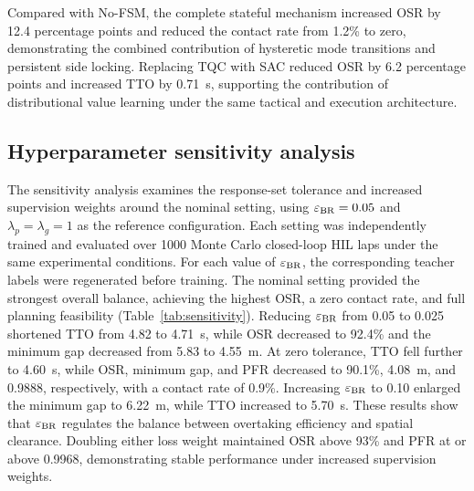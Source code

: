 \documentclass[journal,twoside,web]{ieeecolor}
\begin{document}
Compared with No-FSM, the complete stateful mechanism increased OSR by
12.4 percentage points and reduced the contact rate from 1.2\% to zero,
demonstrating the combined contribution of hysteretic mode transitions and
persistent side locking. Replacing TQC with SAC reduced OSR by 6.2 percentage
points and increased TTO by 0.71~s, supporting the contribution of
distributional value learning under the same tactical and execution
architecture.




\subsection{Hyperparameter sensitivity analysis}
\label{subsec:sensitivity}

The sensitivity analysis examines the response-set tolerance and increased
supervision weights around the nominal setting, using
$\varepsilon_{\rm BR}=0.05$ and
$\lambda_p=\lambda_g=1$ as the reference configuration. Each setting was
independently trained and evaluated over 1000 Monte Carlo closed-loop HIL laps
under the same experimental conditions. For each value of
$\varepsilon_{\rm BR}$, the corresponding teacher labels were regenerated
before training.
The nominal setting provided the strongest overall balance, achieving the
highest OSR, a zero contact rate, and full planning feasibility
(Table~\ref{tab:sensitivity}). Reducing $\varepsilon_{\rm BR}$ from 0.05 to
0.025 shortened TTO from 4.82 to 4.71~s, while OSR decreased to 92.4\% and
the minimum gap decreased from 5.83 to 4.55~m. At zero tolerance, TTO fell
further to 4.60~s, while OSR, minimum gap, and PFR decreased to 90.1\%,
4.08~m, and 0.9888, respectively, with a contact rate of 0.9\%. Increasing
$\varepsilon_{\rm BR}$ to 0.10 enlarged the minimum gap to 6.22~m, while
TTO increased to 5.70~s. These results show that $\varepsilon_{\rm BR}$
regulates the balance between overtaking efficiency and spatial clearance.
Doubling either loss weight maintained OSR above 93\% and PFR at or above
0.9968, demonstrating stable performance under increased supervision weights.
\end{document}

